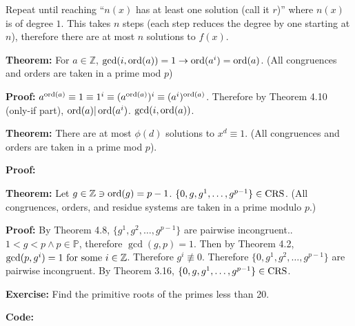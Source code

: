 Repeat until reaching ``\(n(x)\) has at least one solution (call it \(r\))'' where \(n(x)\) is of degree \(1\). This takes \(n\) steps (each step reduces the degree by one starting at \(n\)), therefore there are at most \(n\) solutions to \(f(x)\).

\item \textbf{Theorem:}  For \(a \in \mathbb Z\), \(\gcd(i, \operatorname{ord}(a)) = 1 \rightarrow \operatorname{ord}(a^i) = \operatorname{ord}(a)\). (All congruences and orders are taken in a prime mod \(p\))

\textbf{Proof:} \(a^{\operatorname{ord}(a)} \equiv 1 \equiv 1^i \equiv (a^{\operatorname{ord}(a)})^i \equiv (a^i)^{\operatorname{ord}(a)}\). Therefore by Theorem 4.10 (only-if part), \(\operatorname{ord}(a)|\operatorname{ord}(a^i)\). \(\gcd(i, \operatorname{ord}(a))\). %

\item \textbf{Theorem:} There are at most \(\phi(d)\) solutions to \(x^d \equiv 1\). (All congruences and orders are taken in a prime mod \(p\)).

\textbf{Proof:} %

\item \textbf{Theorem:} Let \(g \in \mathbb Z \ni \operatorname{ord}(g) = p - 1\). \(\{0, g, g^1, \dots, g^{p-1}\} \in \operatorname{CRS}\). (All congruences, orders, and residue systems are taken in a prime modulo \(p\).)

\textbf{Proof:} By Theorem 4.8, \(\{g^1, g^2, \dots, g^{p-1}\}\) are pairwise incongruent.. \(1 < g < p \wedge p \in \mathbb P\), therefore \(\gcd(g, p) = 1\). Then by Theorem 4.2, \(\gcd(p, g^i) = 1 \textrm{\ for some\ } i \in \mathbb Z\).  Therefore \(g^i \not \equiv 0\). Therefore \(\{0, g^1, g^2, \dots, g^{p-1}\}\) are pairwise incongruent. By Theorem 3.16, \(\{0, g, g^1, \dots, g^{p-1}\} \in \operatorname{CRS}\). \qedhere

\item \textbf{Exercise:}  Find the primitive roots of the primes less than 20.

\textbf{Code:}

